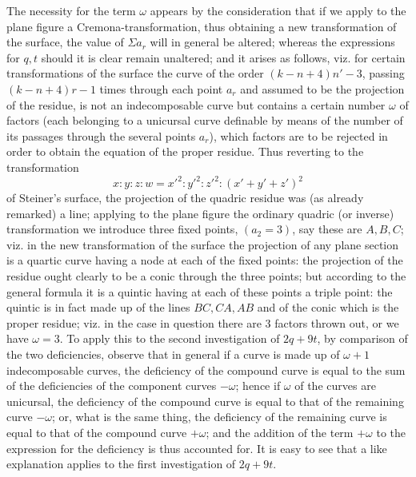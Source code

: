 \documentclass[11pt,a4paper]{article}
\begin{document}
The necessity for the term $\omega$ appears by the consideration that if we apply to the
plane figure a Cremona-transformation, thus obtaining a new transformation of the
surface, the value of $\Sigma a_r$ will in general be altered; whereas the expressions
for $q,t$ should it is clear remain unaltered; and it arises as follows, viz. for certain
transformations of the surface the curve of the order $(k-n+4)n'-3$, passing
$(k-n+4)r-1$ times through each point $a_r$ and assumed to be the projection of the
residue, is not an indecomposable curve but contains a certain number $\omega$ of
factors (each belonging to a unicursal curve definable by means of the number of its
passages through the several points $a_r$), which factors are to be rejected in order
to obtain the equation of the proper residue. Thus reverting to the transformation
\[
x:y:z:w=x'^2:y'^2:z'^2:(x'+y'+z')^2
\]
of Steiner's surface, the projection of the quadric residue was (as already remarked) a
line; applying to the plane figure the ordinary quadric (or inverse) transformation we
introduce three fixed points, $(a_2=3)$, say these are $A,B,C$; viz. in the new
transformation of the surface the projection of any plane section is a quartic curve
having a node at each of the fixed points: the projection of the residue ought clearly
to be a conic through the three points; but according to the general formula it is a
quintic having at each of these points a triple point: the quintic is in fact made up
of the lines $BC,CA,AB$ and of the conic which is the proper residue; viz. in the
case in question there are 3 factors thrown out, or we have $\omega=3$. To apply this
to the second investigation of $2q+9t$, by comparison of the two deficiencies, observe
that in general if a curve is made up of $\omega+1$ indecomposable curves, the
deficiency of the compound curve is equal to the sum of the deficiencies of the
component curves $-\omega$; hence if $\omega$ of the curves are unicursal, the deficiency of
the compound curve is equal to that of the remaining curve $-\omega$; or, what is the
same thing, the deficiency of the remaining curve is equal to that of the compound
curve $+\omega$; and the addition of the term $+\omega$ to the expression for the
deficiency is thus accounted for. It is easy to see that a like explanation applies to
the first investigation of $2q+9t$.
\end{document}
